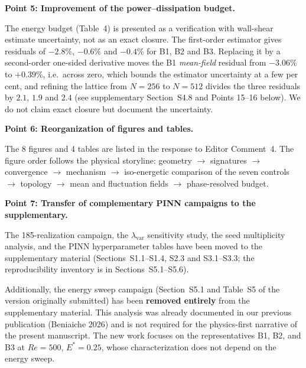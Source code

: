 \documentclass[11pt,a4paper]{article}
\begin{document}
\vspace{0.5em}

\noindent\textbf{Point 5: Improvement of the power--dissipation budget.}

The energy budget (Table~4) is presented as a verification with wall-shear
estimate uncertainty, not as an exact closure. The first-order estimator gives
residuals of $-2.8\%$, $-0.6\%$ and $-0.4\%$ for B1, B2 and B3. Replacing it by a
second-order one-sided derivative moves the B1 \emph{mean-field} residual from
$-3.06\%$ to $+0.39\%$, i.e.\ across zero, which bounds the estimator
uncertainty at a few per cent, and refining the lattice from $N=256$ to $N=512$
divides the three residuals by $2.1$, $1.9$ and $2.4$ (see
supplementary Section~S4.8 and Points 15--16 below). We do not claim exact closure but document the
uncertainty.

\vspace{0.5em}

\noindent\textbf{Point 6: Reorganization of figures and tables.}

The 8 figures and 4 tables are listed in the response to Editor Comment~4. The
figure order follows the physical storyline: geometry $\to$ signatures $\to$
convergence $\to$ mechanism $\to$ iso-energetic comparison of the seven controls
$\to$ topology $\to$ mean and fluctuation fields $\to$ phase-resolved budget.

\vspace{0.5em}

\noindent\textbf{Point 7: Transfer of complementary PINN campaigns to the
supplementary.}

The 185-realization campaign, the $\lambda_{\mathrm{var}}$ sensitivity study,
the seed multiplicity analysis, and the PINN hyperparameter tables have been
moved to the supplementary material (Sections~S1.1--S1.4, S2.3 and
S3.1--S3.3; the reproducibility inventory is in Sections~S5.1--S5.6).

Additionally, the energy sweep campaign (Section~S5.1 and Table~S5 of the
version originally submitted) has
been \textbf{removed entirely} from the supplementary material. This analysis was
already documented in our previous publication (Beniaiche 2026) and is not
required for the physics-first narrative of the present manuscript. The new work
focuses on the representatives B1, B2, and B3 at $Re=500$, $E^*=0.25$, whose
characterization does not depend on the energy sweep.

\vspace{0.5em}
\end{document}
